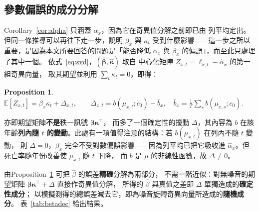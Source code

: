\documentclass[UTF8, fontset=macnew, a4paper, 12pt]{ctexart}
\newtheorem{prop}{Proposition}
\newcommand{\Ex}{\mathbb{E}}
\begin{document}
\subsection{參數偏誤的成分分解}\label{sec:betadec}

Corollary~\ref{cor:alpha} 只涵蓋 $\alpha_x$，因為它在奇異值分解之前即已由
列平均定出。但同一條推導可以再往下走一步，說明 $\beta_x$ 與 $\kappa_t$
受到什麼影響——這一步之所以重要，是因為本文所要回答的問題是「能否降低
$\alpha_x$ 與 $\beta_x$ 的偏誤」，而至此只處理了其中一個。
依式~\eqref{eq:svd}，$(\hat{\boldsymbol\beta},\hat{\boldsymbol\kappa})$ 取自
中心化矩陣 $Z_{x,t}=\ell_{x,t}-\hat\alpha_x$ 的第一組奇異向量，
取其期望並利用 $\sum_t\kappa_t=0$，即得：

\begin{prop}\label{prop:beta}
$\displaystyle \Ex[Z_{x,t}]=\beta_x\kappa_t+\Delta_{x,t},\qquad
\Delta_{x,t}=b(\mu_{x,t};c_0)-\bar b_x,\quad
\bar b_x=\frac1T\sum_s b(\mu_{x,s};c_0).$
\end{prop}

亦即期望矩陣\textbf{不是}秩一訊號 $\boldsymbol\beta\boldsymbol\kappa^{\top}$，
而多了一個確定性的擾動 $\Delta$，其內容為 $b$ 在該年齡\textbf{列內隨 $t$
的變動}。此處有一項值得注意的結構：若 $b(\mu_{x,t})$ 在列內不隨 $t$ 變動，
則 $\Delta=0$，$\beta_x$ 完全不受對數偏誤影響——因為列平均已把它吸收進
$\hat\alpha_x$。但死亡率隨年份改善使 $\mu_{x,t}$ 隨 $t$ 下降，
而 $b$ 是 $\mu$ 的非線性函數，故 $\Delta\ne0$。

由Proposition~\ref{prop:beta} 可把 $\hat\beta$ 的誤差\textbf{精確}分解為兩部分，
不需一階近似：對無噪音的期望矩陣
$\boldsymbol\beta\boldsymbol\kappa^{\top}+\Delta$ 直接作奇異值分解，
所得的 $\hat\beta$ 與真值之差即 $\Delta$ 單獨造成的\textbf{確定性成分}；
以模擬測得的總誤差減去它，即為噪音旋轉奇異向量所造成的\textbf{隨機成分}。
表~\ref{tab:betadec} 給出結果。
\end{document}
